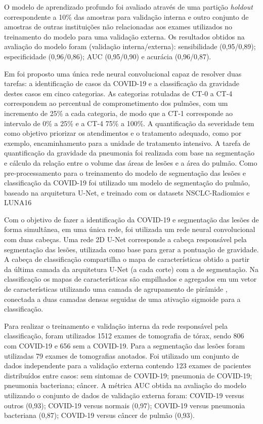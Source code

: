 O modelo de aprendizado profundo foi avaliado através de uma partição \textit{holdout} correspondente a 10\% das amostras para validação interna e outro conjunto de amostras de outras instituições não relacionadas aos exames utilizados no treinamento do modelo para uma validação externa. Os resultados obtidos na avaliação do modelo foram (validação interna/externa): sensibilidade (0,95/0,89); especificidade (0,96/0,86); AUC (0,95/0,90) e acurácia (0,96/0,87).

Em \cite{goncharov2021ct} foi proposto uma única rede neural convolucional capaz de resolver duas tarefas: a identificação de casos da COVID-19 e a classificação da gravidade destes casos em cinco categorias. As categorias rotuladas de CT-0 a CT-4 correspondem ao percentual de comprometimento dos pulmões, com um incremento de 25\% a cada categoria, de modo que a CT-1 corresponde ao intervalo de 0\% a 25\% e a CT-4 75\% a 100\%. A quantificação da severidade tem como objetivo priorizar os atendimentos e o tratamento adequado, como por exemplo, encaminhamento para a unidade de tratamento intensivo. A tarefa de quantificação da gravidade da pneumonia foi realizada com base na segmentação e cálculo da relação entre o volume das áreas de lesões e a área do pulmão. Como pre-processamento para o treinamento do modelo de segmentação das lesões e classificação da COVID-19 foi utilizado um modelo de segmentação do pulmão, baseado na arquitetura U-Net, e treinado com os datasets NSCLC-Radiomics \cite{aerts2019data} e LUNA16 \cite{van2019luna16}

Com o objetivo de fazer a identificação da COVID-19 e segmentação das lesões de forma simultânea, em uma única rede, foi utilizada um rede neural convolucional com duas cabeças. Uma rede 2D U-Net \cite{ronneberger2015u} corresponde a cabeça responsável pela segmentação das lesões, utilizada como base para gerar a pontuação de gravidade. A cabeça de classificação compartilha o mapa de características obtido a partir da última camada da arquitetura U-Net (a cada corte) com a de segmentação. Na classificação os mapas de características são empilhados e agregados em um vetor de características utilizando uma camada de agrupamento de pirâmide \cite{he2015spatial}, conectada a duas camadas densas seguidas de uma ativação sigmoide para a classificação.

Para realizar o treinamento e validação interna da rede responsável pela classificação, foram utilizados 1512 exames de tomografia de tórax, sendo 806 com COVID-19 e 656 sem a COVID-19. Para a segmentação das lesões foram utilizadas 79 exames de tomografias anotados. Foi utilizado um conjunto de dados independente para a validação externa contendo 123 exames de pacientes distribuídos entre casos: sem sintomas de COVID-19; pneumonia de COVID-19; pneumonia bacteriana; câncer. A métrica AUC obtida na avaliação do modelo utilizando o conjunto de dados de validação externa foram: COVID-19 versus outros (0,93); COVID-19 versus normais (0,97); COVID-19 versus pneumonia bacteriana (0,87); COVID-19 versus câncer de pulmão (0,93).

